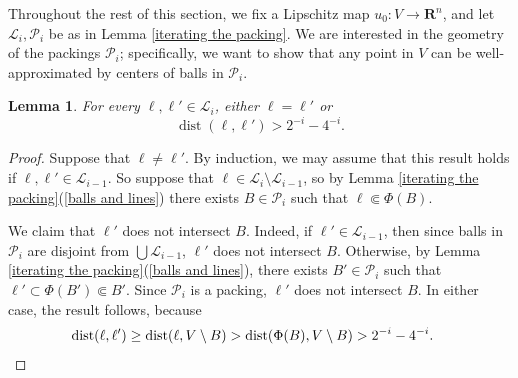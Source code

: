 \documentclass[reqno,11pt]{amsart}
\newcommand{\RR}{\mathbf{R}}
\DeclareMathOperator{\dist}{dist}
\newtheorem{lemma}[theorem]{Lemma}
\theoremstyle{definition}
\numberwithin{equation}{section}
\begin{document}
Throughout the rest of this section, we fix a Lipschitz map $u_0: V \to \RR^n$, and let $\mathscr L_i, \mathscr P_i$ be as in Lemma \ref{iterating the packing}.
We are interested in the geometry of the packings $\mathscr P_i$; specifically, we want to show that any point in $V$ can be well-approximated by centers of balls in $\mathscr P_i$.

\begin{lemma}\label{separation of line segments}
For every $\ell, \ell' \in \mathscr L_i$, either $\ell = \ell'$ or
$$\dist(\ell, \ell') > 2^{-i} - 4^{-i}.$$
\end{lemma}
\begin{proof}
Suppose that $\ell \neq \ell'$.
By induction, we may assume that this result holds if $\ell, \ell' \in \mathscr L_{i - 1}$.
So suppose that $\ell \in \mathscr L_i \setminus \mathscr L_{i - 1}$, so by Lemma \ref{iterating the packing}(\ref{balls and lines}) there exists $B \in \mathscr P_i$ such that $\ell \Subset \Phi(B)$.

We claim that $\ell'$ does not intersect $B$.
Indeed, if $\ell' \in \mathscr L_{i - 1}$, then since balls in $\mathscr P_i$ are disjoint from $\bigcup \mathscr L_{i - 1}$, $\ell'$ does not intersect $B$.
Otherwise, by Lemma \ref{iterating the packing}(\ref{balls and lines}), there exists $B' \in \mathscr P_i$ such that $\ell' \subset \Phi(B') \Subset B'$. Since $\mathscr P_i$ is a packing, $\ell'$ does not intersect $B$.
In either case, the result follows, because
\begin{align*} 
\dist(\ell, \ell') &\geq \dist(\ell, V \setminus B) > \dist(\Phi(B), V \setminus B) > 2^{-i} - 4^{-i}. \qedhere
\end{align*}
\end{proof}
\end{document}
